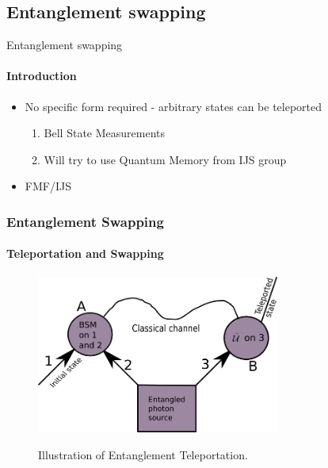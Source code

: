\documentclass[serif,8pt]{beamer}
\begin{document}
{{\subsection{Entanglement swapping}
\begin{frame}{Entanglement swapping}
	\framesubtitle{Introduction}
	\begin{itemize}
		\item No specific form required - arbitrary states can be teleported
			\begin{enumerate}
				\item Bell State Measurements
				\item Will try to use Quantum Memory from IJS group
			\end{enumerate}
		\item FMF/IJS
	\end{itemize}
\end{frame}

%
%
\begin{frame}[t]
    \frametitle{Entanglement Swapping}
    \framesubtitle{Teleportation and Swapping}
    \begin{figure}[]
      \centering
      \caption{Illustration of Entanglement Teleportation.}
      \includegraphics[width=8cm]{EntanglementTeleportation.png}
      \label{fig:Tele}
    \end{figure}
\end{frame}


}}
\end{document}
